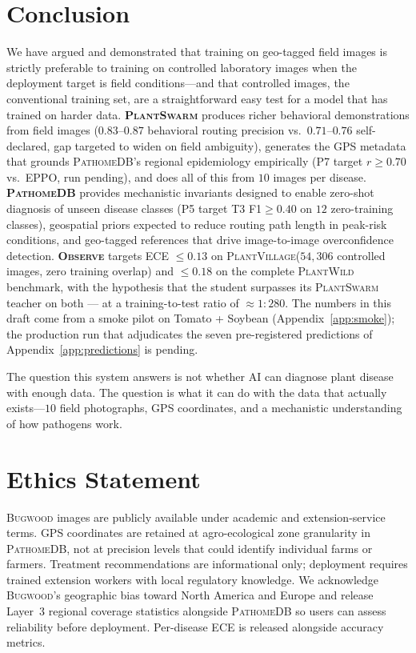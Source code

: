 \documentclass[11pt,twocolumn]{article}
\newcommand{\observe}{\textsc{Observe}\xspace}
\newcommand{\plantswarm}{\textsc{PlantSwarm}\xspace}
\newcommand{\pathomedb}{\textsc{PathomeDB}\xspace}
\newcommand{\bugwood}{\textsc{Bugwood}\xspace}
\newcommand{\pv}{\textsc{PlantVillage}\xspace}
\newcommand{\pw}{\textsc{PlantWild}\xspace}
\begin{document}
\section{Conclusion}
\label{sec:conclusion}

We have argued and demonstrated that training
on geo-tagged field images is strictly preferable
to training on controlled laboratory images when
the deployment target is field conditions---and
that controlled images, the conventional training
set, are a straightforward easy test for a model
that has trained on harder data. \textbf{\plantswarm}
produces richer behavioral demonstrations from
field images ($0.83$--$0.87$ behavioral routing
precision vs.\ $0.71$--$0.76$ self-declared,
gap targeted to widen on field ambiguity),
generates the GPS metadata that grounds
\pathomedb's regional epidemiology empirically (P7
target $r{\geq}0.70$ vs.\ EPPO, run pending), and
does all of this from $10$ images per disease.
\textbf{\pathomedb} provides mechanistic invariants
designed to enable zero-shot diagnosis of unseen
disease classes (P5 target T3 F1${\geq}0.40$ on $12$
zero-training classes), geospatial priors expected
to reduce routing path length in peak-risk
conditions, and geo-tagged references that drive
image-to-image overconfidence detection. \textbf{\observe}
targets ECE ${\leq}0.13$ on \pv ($54{,}306$
controlled images, zero training overlap) and
${\leq}0.18$ on the complete \pw benchmark, with the
hypothesis that the student surpasses its
\plantswarm teacher on both --- at a training-to-test
ratio of ${\approx}1{:}280$. The numbers in this
draft come from a smoke pilot on Tomato + Soybean
(Appendix~\ref{app:smoke}); the production run that
adjudicates the seven pre-registered predictions of
Appendix~\ref{app:predictions} is pending.

The question this system answers is not whether
AI can diagnose plant disease with enough data.
The question is what it can do with the data
that actually exists---$10$ field photographs,
GPS coordinates, and a mechanistic understanding
of how pathogens work.

\section*{Ethics Statement}

\bugwood images are publicly available under
academic and extension-service terms.
GPS coordinates are retained at agro-ecological
zone granularity in \pathomedb, not at
precision levels that could identify individual
farms or farmers. Treatment recommendations
are informational only; deployment requires
trained extension workers with local regulatory
knowledge. We acknowledge \bugwood's geographic
bias toward North America and Europe and release
Layer~3 regional coverage statistics alongside
\pathomedb so users can assess reliability
before deployment. Per-disease ECE is released
alongside accuracy metrics.
\end{document}
